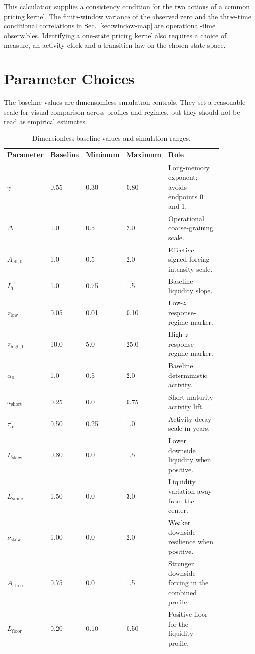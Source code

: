 \documentclass[11pt]{article}
\begin{document}
This calculation supplies a consistency condition for the two actions
of a common pricing kernel. The finite-window variance of the observed
zero and the three-time conditional correlations in
Sec.~\ref{sec:window-map} are operational-time observables. Identifying
a one-state pricing kernel also requires a choice of measure, an activity
clock and a transition law on the chosen state space.

\section{Parameter Choices}

The baseline values are dimensionless simulation controls. They set a
reasonable scale for visual comparison across profiles and regimes, but they
should not be read as empirical estimates.

\begin{table}[ht]
\centering
\small
\caption{Dimensionless baseline values and simulation ranges.}
\label{tab:parameter-ranges}
\begin{tabular}{p{0.18\linewidth}p{0.13\linewidth}p{0.13\linewidth}p{0.13\linewidth}p{0.30\linewidth}}
\toprule
Parameter & Baseline & Minimum & Maximum & Role \\
\midrule
\(\gamma\) & 0.55 & 0.30 & 0.80 & Long-memory exponent; avoids endpoints 0 and 1. \\
\(\Delta\) & 1.0 & 0.5 & 2.0 & Operational coarse-graining scale. \\
\(A_{\mathrm{eff},0}\) & 1.0 & 0.5 & 2.0 & Effective signed-forcing intensity scale. \\
\(L_0\) & 1.0 & 0.75 & 1.5 & Baseline liquidity slope. \\
\(z_{\mathrm{low}}\) & 0.05 & 0.01 & 0.10 & Low-\(z\) response-regime marker. \\
\(z_{\mathrm{high},0}\) & 10.0 & 5.0 & 25.0 & High-\(z\) response-regime marker. \\
\(\alpha_0\) & 1.0 & 0.5 & 2.0 & Baseline deterministic activity. \\
\(a_{\mathrm{short}}\) & 0.25 & 0.0 & 0.75 & Short-maturity activity lift. \\
\(\tau_\alpha\) & 0.50 & 0.25 & 1.0 & Activity decay scale in years. \\
\(L_{\mathrm{skew}}\) & 0.80 & 0.0 & 1.5 & Lower downside liquidity when positive. \\
\(L_{\mathrm{smile}}\) & 1.50 & 0.0 & 3.0 & Liquidity variation away from the center. \\
\(\nu_{\mathrm{skew}}\) & 1.00 & 0.0 & 2.0 & Weaker downside resilience when positive. \\
\(A_{\mathrm{stress}}\) & 0.75 & 0.0 & 1.5 & Stronger downside forcing in the combined profile. \\
\(L_{\mathrm{floor}}\) & 0.20 & 0.10 & 0.50 & Positive floor for the liquidity profile. \\
\bottomrule
\end{tabular}
\end{table}
\end{document}
